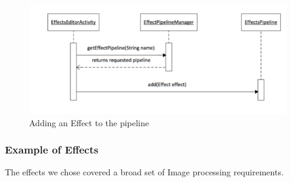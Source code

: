 \documentclass{sig-alternate}
\begin{document}
\begin{figure}[H]
\noindent \includegraphics[scale=.3]{EffectsPipline.png}
\caption{Adding an Effect to the pipeline}
\end{figure}

\subsubsection{Example of Effects}
The  effects we chose covered a broad set of Image processing requirements.
\end{document}
